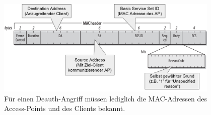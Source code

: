 \begin{figure}[ht]
	\centering
	\includegraphics[width=0.95\textwidth]{graphics/deauth-attack}
	\caption{Für einen Deauth-Angriff müssen lediglich die MAC-Adressen des Access-Points und des Clients bekannt.}
	\label{fig:deauth-attack}
\end{figure}

